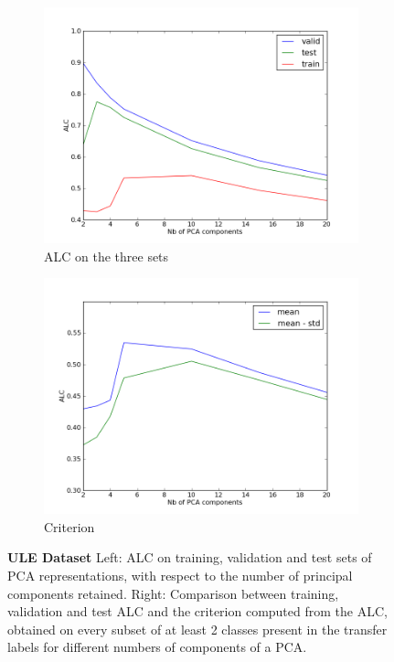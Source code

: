 \begin{figure}
\centering
\begin{subfigure}{.45\textwidth}
\centering
\includegraphics[height=0.25\textheight,keepaspectratio]{article1/images/alc-overfitting.png}
\caption{ALC on the three sets}
\label{fig:alc-overfitting}
\end{subfigure}
\begin{subfigure}{.45\textwidth}
\centering
\includegraphics[height=0.25\textheight,keepaspectratio]{article1/images/alc-criterion.png}
\caption{Criterion}
\label{fig:alc-criterion}
\end{subfigure}
\caption[ALC Comparison]{
{\bf ULE Dataset} Left: ALC on training, validation and
test sets of PCA representations, with respect to the number of principal components retained.
Right: Comparison between training, validation and test ALC and the criterion computed from
the ALC, obtained on every subset of at least 2 classes present in the transfer
labels for different numbers of components of a PCA.}
\label{fig:alc-comparison}
\end{figure}



